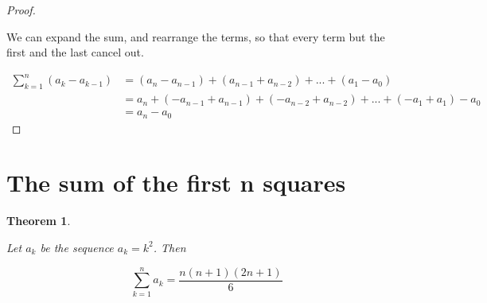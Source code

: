 \documentclass{article}
\newtheorem{theorem}{Theorem}
\begin{document}
\begin{proof}
\begin{flushleft}
We can expand the sum, and rearrange the terms, so that every term but the first and the last cancel out.
\end{flushleft}
\begin{align*}
\sum_{k=1}^{n} (a_{k} - a_{k-1}) &= (a_{n} - a_{n-1}) + (a_{n-1} + a_{n-2}) + ... + (a_{1} - a_{0}) \\
&= a_{n} + (-a_{n-1} + a_{n-1}) + (-a_{n-2} + a_{n-2}) + ... + (-a_{1} + a_{1}) - a_{0} \\
&= a_{n} - a_{0}
\end{align*}

\end{proof}

\section{The sum of the first n squares}

\begin{theorem}
\begin{flushleft}
Let $a_{k}$ be the sequence $a_{k} = k^2$. Then
\end{flushleft}
\begin{equation*}
\sum_{k=1}^{n} a_{k} = \frac{n(n+1)(2n+1)}{6}
\end{equation*}
\end{theorem}
\end{document}
